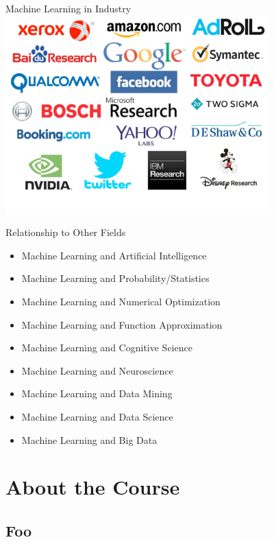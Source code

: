 \documentclass[serif,xcolor=pdftex,dvipsnames,table,hyperref={bookmarks=false,breaklinks}]{beamer}
\begin{document}
\begin{frame}[t]{Machine Learning in Industry}
 \centering
 \includegraphics[width=4in]{../Figures/ml_industry.pdf}
\end{frame}


\begin{frame}[t]{Relationship to Other Fields}
  \begin{itemize}[<+->]
    \item Machine Learning and Artificial Intelligence
    \item Machine Learning and Probability/Statistics
    \item Machine Learning and Numerical Optimization
    \item Machine Learning and Function Approximation
    \item Machine Learning and Cognitive Science
    \item Machine Learning and Neuroscience
    \item Machine Learning and Data Mining 
    \item Machine Learning and Data Science
    \item Machine Learning and Big Data
  \end{itemize}
\end{frame}



\section{About the Course}
\subsection{Foo}
\end{document}
